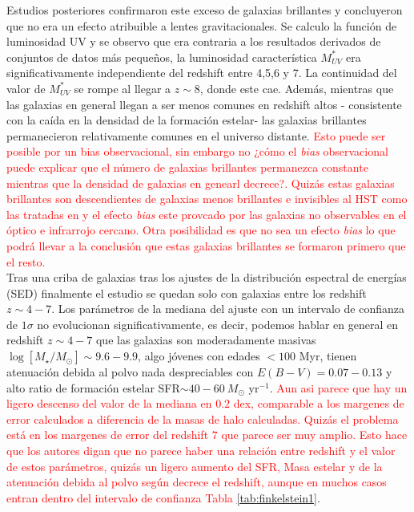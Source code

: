 \documentclass{article}
\begin{document}
Estudios posteriores confirmaron este exceso de galaxias brillantes y concluyeron que no era un efecto atribuible a lentes gravitacionales. Se calculo la función de luminosidad UV y se observo que era contraria a los resultados derivados de conjuntos de datos más pequeños, la luminosidad característica $M_{UV}^*$ era significativamente independiente del redshift entre 4,5,6 y 7. La continuidad del valor de $M_{UV}^*$ se rompe al llegar a $z\sim 8$, donde este cae. Además, mientras que las galaxias en general llegan a ser menos comunes en redshift altos - consistente con la caída en la densidad de la formación estelar- las galaxias brillantes permanecieron relativamente comunes en el universo distante. \textcolor{red}{Esto puede ser posible por un bias observacional, sin embargo no ¿cómo el \textit{bias} observacional puede explicar que el número de galaxias brillantes permanezca constante mientras que la densidad de galaxias en genearl decrece?. Quizás estas galaxias brillantes son descendientes de galaxias menos brillantes e invisibles al HST como las tratadas en \cite{wang2019dominant} y el efecto \textit{bias} este provcado por las galaxias no observables en el óptico e infrarrojo cercano. Otra posibilidad es que no sea un efecto \textit{bias} lo que podrá llevar a la conclusión que estas galaxias brillantes se formaron primero que el resto.}\\

Tras una criba de galaxias tras los ajustes de la distribución espectral de energías (SED) finalmente el estudio se quedan solo con galaxias entre los redshift $z\sim 4-7$. Los parámetros de la mediana del ajuste con un intervalo de confianza de $1\sigma$ no evolucionan significativamente, es decir, podemos hablar en general en redshift $z\sim 4-7$ que las galaxias son moderadamente masivas $\log[M_\star/M_\odot]\sim 9.6-9.9$, algo jóvenes con edades $<100$ Myr, tienen atenuación debida al polvo nada despreciables con $E(B-V)=0.07-0.13$ y alto ratio de formación estelar SFR$\sim 40-60\ M_\odot$ yr$^{-1}$. \textcolor{red}{Aun asi parece que hay un ligero descenso del valor de la mediana en $0.2$ dex, comparable a los margenes de error calculados a diferencia de la masas de halo calculadas. Quizás el problema está en los margenes de error del redshift $7$ que parece ser muy amplio. Esto hace que los autores digan que no parece haber una relación entre redshift y el valor de estos parámetros, quizás un ligero aumento del SFR, Masa estelar y de la atenuación debida al polvo según decrece el redshift, aunque en muchos casos entran dentro del intervalo de confianza Tabla \ref{tab:finkelstein1}}.\\
\end{document}
